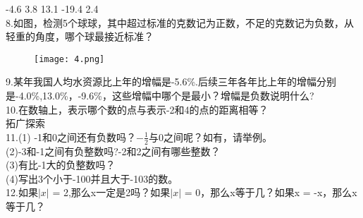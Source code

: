 \documentclass[UTF8]{article}
\begin{document}
	-4.6{\textcelsius } 3.8{\textcelsius } 13.1{\textcelsius }  -19.4{\textcelsius } 2.4{\textcelsius } \\
	8.如图，检测5个球球，其中超过标准的克数记为正数，不足的克数记为负数，从轻重的角度，哪个球最接近标准？\\
		\begin{figure}[ht]
		\centering
		\texttt{[image: 4.png]}
	\end{figure}
	9.某年我国人均水资源比上年的增幅是-5.6\%.后续三年各年比上年的增幅分别是-4.0\%,13.0\%，-9.6\%，这些增幅中哪个是最小？增幅是负数说明什么?\\
	10.在数轴上，表示哪个数的点与表示-2和4的点的距离相等？\\
	{\heiti 拓广探索}\\
	11.(1) -1和0之间还有负数吗？$-\frac{1}{2}$与0之间呢？如有，请举例。\\
	(2)-3和-1之间有负整数吗?-2和2之间有哪些整数？\\
	(3)有比-1大的负整数吗？\\
	(4)写出3个小于-100并且大于-103的数。\\
	12.如果$\vert x \vert$ = 2,那么x一定是2吗？如果$\vert x \vert$ = 0，那么x等于几？如果x = -x，那么x等于几？\\
\end{document}
